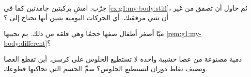\begin{exercise}[$\star$]\label{exo:g1:my-body:8}
جرّب: امشِ بركبتين جامدتين كما في \cref{ex:g1:my-body:stiff}، ثم
حاول أن تصفق من غير أن تثني مرفقيك. أي الحركات اليومية يتبين أنها
تحتاج إلى ؟
\end{exercise}

\begin{exercise}[$\star\star$]\label{exo:g1:my-body:9}
ميّا أصغر أطفال صفها حجمًا وهي قلقة من ذلك. بم تجيبها
\cref{rem:g1:my-body:different}؟
\end{exercise}

\begin{exercise}[$\star\star$]\label{exo:g1:my-body:10}
دمية مصنوعة من عصا خشبية واحدة لا تستطيع الجلوس على كرسي. أين
تقطع العصا وتضيف نقاط دوران لتستطيع الجلوس؟ سمِّ  الجسم التي
تحاكيها قطوعك.
\end{exercise}
